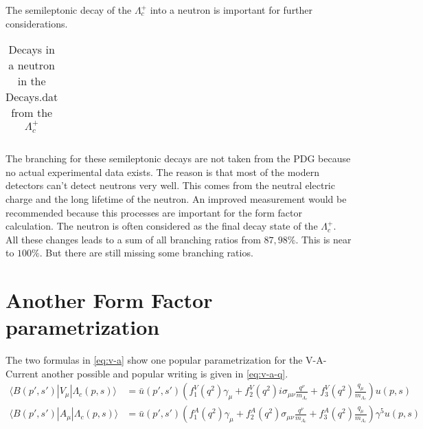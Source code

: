 The semileptonic decay of the \(\Lambda_c^+\) into a neutron is important for 
further considerations.
\begin{longtable}{| c | c |}
  \caption{Decays in a neutron in the Decays.dat from the \(\Lambda_c^+\)}\label{ta:ndecays}\\ 
  \hline
  
\end{longtable}
The branching for these semileptonic decays are not taken from the PDG because
no actual experimental data exists. The reason is that 
most of the modern detectors can't detect neutrons very well. This comes from 
the neutral electric charge and the long lifetime of the neutron. An improved 
measurement would be recommended because this processes are important for 
the form factor calculation. The neutron is often considered as the final 
decay state of the \(\Lambda_c^+\).\\
All these changes leads to a sum of all branching ratios from \(87,98\%\). 
This is near to \(100\%\). But there are still missing some branching 
ratios.

\section{Another Form Factor parametrization}
The two formulas in {\eqref{eq:v-a}} show one popular parametrization for 
the V-A-Current another possible and popular writing is given in 
{\eqref{eq:v-a-q}}.
\begin{align}
  \langle B(p', s') | V_\mu | \Lambda_c(p, s) \rangle & = \bar{u}(p', s') 
  \left( f^V_1(q^2) \gamma_\mu + f^V_2(q^2)i\sigma_{\mu\nu}\frac{q^\nu}{m_{\Lambda_c}} + 
  f^V_3(q^2)\frac{q_\mu}{m_{\Lambda_c}} \right) u(p, s) \nonumber \\
  \langle B(p', s') | A_\mu | \Lambda_c(p, s) \rangle & = \bar{u}(p', s') 
  \left( f^A_1(q^2) \gamma_\mu + f^A_2(q^2)\sigma_{\mu\nu}\frac{q^\nu}{m_{\Lambda_c}} + 
  f^A_3(q^2)\frac{q_\mu}{m_{\Lambda_c}} \right) \gamma^5 u(p, s) \label{eq:v-a-q}
\end{align}

